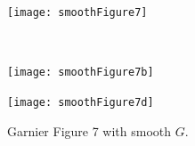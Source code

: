 \documentclass[11pt,a4paper, final, dvipsnames]{article}
\begin{document}
\begin{figure}
    \centering
    \begin{minipage}[b]{\textwidth}
        \centering
        \texttt{[image: smoothFigure7]}
    \end{minipage} \\
    
    \begin{minipage}[b]{0.49\textwidth}
        \centering
        \texttt{[image: smoothFigure7b]}
    \end{minipage} %
    \begin{minipage}[b]{0.49\textwidth}
        \centering                    
        \texttt{[image: smoothFigure7d]}
    \end{minipage}
    \caption{Garnier Figure 7 with smooth $G$.}
\end{figure}
\end{document}
